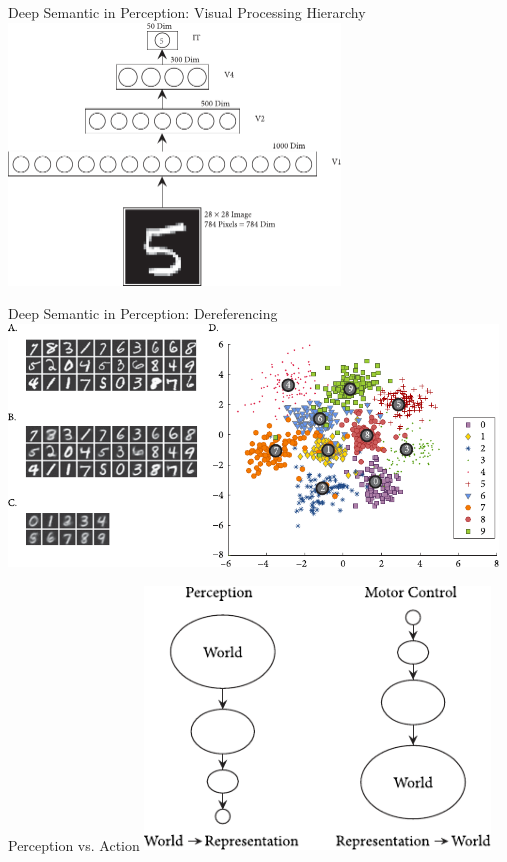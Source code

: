 \documentclass[handout,aspectratio=169]{beamer}
\begin{document}
	\begin{frame}{Deep Semantic in Perception: Visual Processing Hierarchy}
		\centering
		\includegraphics[width=0.66\textwidth]{media/htbab_hierarchy.pdf}
	\end{frame}

	\begin{frame}{Deep Semantic in Perception: Dereferencing}
		\centering
		\vspace{0.5cm}
		\includegraphics[width=0.975\textwidth]{media/htbab_dereference.pdf}\\
		\vspace{0.0575cm}
	\end{frame}

	\begin{frame}{Perception vs. Action}
		\centering
		\includegraphics[height=7cm]{media/htbab_perceptual_motor.pdf}
	\end{frame}
\end{document}
